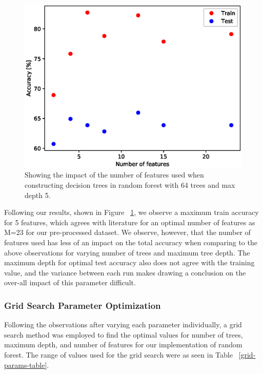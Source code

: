 \documentclass{article} %
\begin{document}
\begin{figure}[ht]
\begin{center}
\includegraphics[scale=0.4]{n_features}
\end{center}
\caption{Showing the impact of the number of features used when constructing decision trees in random forest with 64 trees and max depth 5.}
\label{fig:n_features}
\end{figure}

Following our results, shown in Figure ~\ref{fig:n_features}, we observe a maximum train accuracy for 5 features, which agrees with literature for an optimal number of features as M=23 for our pre-processed dataset. We observe, however, that the number of features used has less of an impact on the total accuracy when comparing to the above observations for varying number of trees and maximum tree depth. The maximum depth for optimal test accuracy also does not agree with the training value, and the variance between each run makes drawing a conclusion on the over-all impact of this parameter difficult.

\subsubsection{Grid Search Parameter Optimization}

Following the observations after varying each parameter individually, a grid search method was employed to find the optimal values for number of trees, maximum depth, and number of features for our implementation of random forest. The range of values used for the grid search were as seen in Table ~\ref{grid-params-table}.
\end{document}
